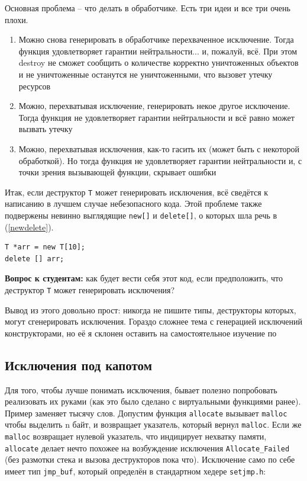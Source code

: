 \documentclass[a4paper,12pt,oneside]{article}
\newif\ifanswers
\begin{document}
Основная проблема -- что делать в обработчике. Есть три идеи и все три очень плохи.
\begin{enumerate}
\item
Можно снова генерировать в обработчике перехваченное исключение. Тогда функция удовлетворяет гарантии нейтральности... и, пожалуй, всё. При этом destroy не сможет сообщить о количестве корректно уничтоженных объектов и не уничтоженные останутся не уничтоженными, что вызовет утечку ресурсов
\item
Можно, перехватывая исключение, генерировать некое другое исключение. Тогда функция не удовлетворяет гарантии нейтральности и всё равно может вызвать утечку
\item
Можно, перехватывая исключения, как-то гасить их (может быть с некоторой обработкой). Но тогда функция не удовлетворяет гарантии нейтральности и, с точки зрения вызывающей функции, скрывает ошибки
\end{enumerate}

Итак, если деструктор \lstinline!T! может генерировать исключения, всё сведётся к написанию в лучшем случае небезопасного кода. Этой проблеме также подвержены невинно выглядящие \lstinline!new[]! и \lstinline!delete[]!, о которых шла речь в (\ref{newdelete}).

\begin{lstlisting}
T *arr = new T[10];
delete [] arr;
\end{lstlisting}

\textbf{Вопрос к студентам:} как будет вести себя этот код, если предположить, что деструктор \lstinline!T! может генерировать исключения?

\ifanswers
TODO: здесь правильный и обоснованный ответ
\fi

Вывод из этого довольно прост: никогда не пишите типы, деструкторы которых, могут сгенерировать исключения. Гораздо сложнее тема с генерацией исключений конструкторами, но её я склонен оставить на самостоятельное изучение по \cite{exceptionalcpp}

\pagebreak
\subsection{Исключения под капотом}\label{Longjmps}

Для того, чтобы лучше понимать исключения, бывает полезно попробовать реализовать их руками (как это было сделано с виртуальными функциями ранее). Пример заменяет тысячу слов. Допустим функция \lstinline!allocate! вызывает \lstinline!malloc! чтобы выделить n байт, и возвращает указатель, который вернул \lstinline!malloc!. Если же \lstinline!malloc! возвращает нулевой указатель, что индицирует нехватку памяти, \lstinline!allocate! делает нечто похожее на возбуждение исключения \lstinline!Allocate_Failed! (без размотки стека и вызова деструкторов пока что). Исключение само по себе имеет тип \lstinline!jmp_buf!, который определён в стандартном хедере \lstinline!setjmp.h!:
\end{document}
